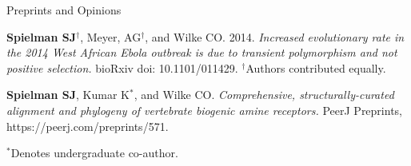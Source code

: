 \documentclass{resume} %
\begin{document}
\vspace*{0.5cm}
\begin{rSection}{Preprints and Opinions}	
\vspace*{0.25cm}
	
\begin{etaremune}[leftmargin=1.5em]
	
\item \textbf{Spielman SJ}$^\dagger$, Meyer, AG$^\dagger$, and Wilke CO. 2014. \emph{Increased evolutionary rate in the 2014 West African Ebola outbreak is due to transient polymorphism and not positive selection.} bioRxiv doi: 10.1101/011429. $^\dagger$Authors contributed equally. \\

\item \textbf{Spielman SJ}, Kumar K$^\ast$, and Wilke CO. \emph{Comprehensive, structurally-curated alignment and phylogeny of vertebrate biogenic amine receptors.} PeerJ Preprints, https://peerj.com/preprints/571. \\ 

			
\end{etaremune}
	
$^\ast$Denotes undergraduate co-author.
	
	
\end{rSection}



\end{document}

